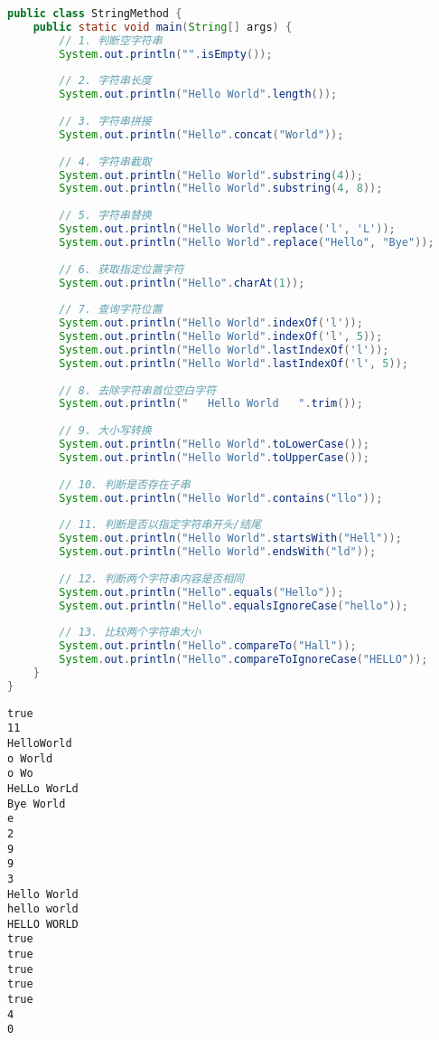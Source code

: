
\begin{lstlisting}[language=Java]
public class StringMethod {
    public static void main(String[] args) {
        // 1. 判断空字符串
        System.out.println("".isEmpty());
        
        // 2. 字符串长度
        System.out.println("Hello World".length());
        
        // 3. 字符串拼接
        System.out.println("Hello".concat("World"));
        
        // 4. 字符串截取
        System.out.println("Hello World".substring(4));
        System.out.println("Hello World".substring(4, 8));
        
        // 5. 字符串替换
        System.out.println("Hello World".replace('l', 'L'));
        System.out.println("Hello World".replace("Hello", "Bye"));
        
        // 6. 获取指定位置字符
        System.out.println("Hello".charAt(1));
        
        // 7. 查询字符位置
        System.out.println("Hello World".indexOf('l'));
        System.out.println("Hello World".indexOf('l', 5));
        System.out.println("Hello World".lastIndexOf('l'));
        System.out.println("Hello World".lastIndexOf('l', 5));
        
        // 8. 去除字符串首位空白字符
        System.out.println("   Hello World   ".trim());
        
        // 9. 大小写转换
        System.out.println("Hello World".toLowerCase());
        System.out.println("Hello World".toUpperCase());
        
        // 10. 判断是否存在子串
        System.out.println("Hello World".contains("llo"));
        
        // 11. 判断是否以指定字符串开头/结尾
        System.out.println("Hello World".startsWith("Hell"));
        System.out.println("Hello World".endsWith("ld"));
        
        // 12. 判断两个字符串内容是否相同
        System.out.println("Hello".equals("Hello"));
        System.out.println("Hello".equalsIgnoreCase("hello"));
        
        // 13. 比较两个字符串大小
        System.out.println("Hello".compareTo("Hall"));
        System.out.println("Hello".compareToIgnoreCase("HELLO"));
    }
}
\end{lstlisting}

\begin{tcolorbox}
	\begin{verbatim}
true
11
HelloWorld
o World
o Wo
HeLLo WorLd
Bye World
e
2
9
9
3
Hello World
hello world
HELLO WORLD
true
true
true
true
true
4
0
	\end{verbatim}
\end{tcolorbox}

